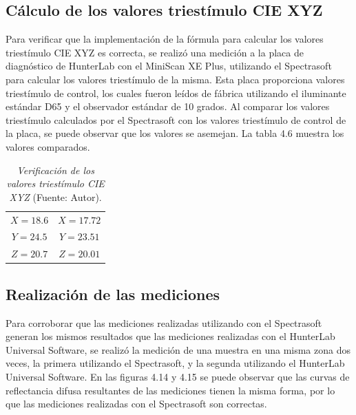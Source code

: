 	\subsection{C\'{a}lculo de los valores triest\'{i}mulo CIE XYZ}
	Para verificar que la implementaci\'{o}n de la f\'{o}rmula para calcular los valores triest\'{i}mulo CIE XYZ	es correcta, se realiz\'{o} una medici\'{o}n a la placa de diagn\'{o}stico de HunterLab con el MiniScan XE Plus, utilizando el Spectrasoft para calcular los valores triest\'{i}mulo de la misma. Esta placa proporciona valores triest\'{i}mulo de control, los cuales fueron le\'{i}dos de f\'{a}brica utilizando el iluminante est\'{a}ndar D65 y el observador est\'{a}ndar de 10 grados. Al comparar los valores triest\'{i}mulo calculados por el Spectrasoft con los valores triest\'{i}mulo de control de la placa, se puede observar que los valores se asemejan. La tabla 4.6 muestra los valores comparados.
	
	\begin{table}[h]
		\small
		\caption[Verificaci\'{o}n de los valores triest\'{i}mulo CIE XYZ]{\textit{Verificaci\'{o}n de los valores triest\'{i}mulo CIE XYZ} (Fuente: Autor).}
		\centering
		\setlength{\extrarowheight}{\altocelda}
		\begin{tabulary}{\anchotabla}{|c|c|}
			\hline
			 & \\ \hline
			$X = 18.6$ & $X = 17.72$\\ \hline
			$Y = 24.5$ & $Y = 23.51$\\ \hline
			$Z = 20.7$ & $Z = 20.01$\\ \hline
		\end{tabulary}
	\end{table}
	
	\subsection{Realizaci\'{o}n de las mediciones}
		Para corroborar que las mediciones realizadas utilizando con el Spectrasoft generan los mismos resultados que las mediciones realizadas con el HunterLab Universal Software, se realiz\'{o} la medici\'{o}n de una muestra en una misma zona dos veces, la primera utilizando el Spectrasoft, y la segunda utilizando el HunterLab Universal Software. En las figuras 4.14 y 4.15 se puede observar que las curvas de reflectancia difusa resultantes de las mediciones tienen la misma forma, por lo que las mediciones realizadas con el Spectrasoft son correctas.
	\newpage
		

